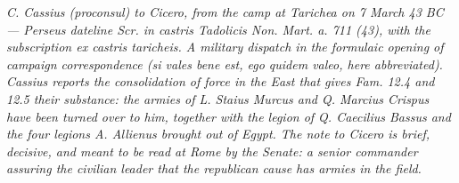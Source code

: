 
\textit{C. Cassius (proconsul) to Cicero, from the camp at Tarichea
on 7 March 43 BC --- Perseus dateline \textit{Scr. in castris
Tadolicis Non. Mart. a. 711 (43)}, with the subscription
\emph{ex castris taricheis}. A military dispatch in the formulaic
opening of campaign correspondence (\emph{si vales bene est, ego
quidem valeo}, here abbreviated). Cassius reports the consolidation
of force in the East that gives \emph{Fam.} 12.4 and 12.5 their
substance: the armies of L. Staius Murcus and Q. Marcius Crispus have
been turned over to him, together with the legion of Q. Caecilius
Bassus and the four legions A. Allienus brought out of Egypt. The
note to Cicero is brief, decisive, and meant to be read at Rome by
the Senate: a senior commander assuring the civilian leader that the
republican cause has armies in the field.}
